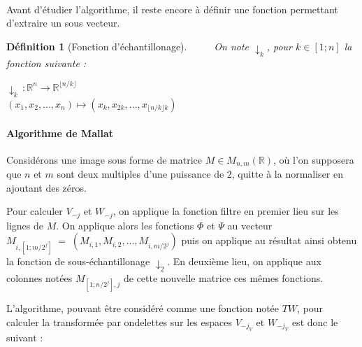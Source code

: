 \documentclass[a4paper,10pt]{report}
\theoremstyle{break}
\newtheorem{Def}{D\'{e}finition}
\begin{document}
    \paragraph{} Avant d'\'{e}tudier l'algorithme, il reste encore \`{a} d\'{e}finir une fonction permettant d'extraire un sous vecteur.
    
    \begin{Def}[Fonction d'\'{e}chantillonage]
	$\phantom{Prop}$ On note $\downarrow_k $, pour $k \in [1;n]$ la fonction suivante :
	\begin{center}
	  $ \downarrow_k \, : \mathbb{R}^n \longrightarrow \mathbb{R}^{\lfloor n / k \rfloor} $ \\
	  $ (x_1, x_2, ..., x_n) \longmapsto (x_k, x_{2 k}, ..., x_{\lfloor n / k \rfloor k}) $
	\end{center}
    \end{Def}
      
\newpage

    \paragraph{Algorithme de Mallat} Consid\'{e}rons une image sous forme de matrice $M \in M_{n,m}(\mathbb{R})$, o\`{u} l'on supposera
	que $n$ et $m$ sont deux multiples d'une puissance de $2$, quitte \`{a} la normaliser en ajoutant des z\'{e}ros. \newline
	
	Pour calculer $V_{-j}$ et $W_{-j}$, on applique la fonction filtre en premier lieu sur les lignes de $M$. \newline
	On applique alors les fonctions $ \varPhi $ et $\varPsi$ au vecteur 
	$ M_{i,[1;m/2^j]} \; = \; (M_{i,1}, M_{i,2}, ..., M_{i, m/2^j}) $ 
	puis on applique au r\'{e}sultat ainsi obtenu la fonction de sous-\'{e}chantillonage $\downarrow_2$.
	En deuxi\`{e}me lieu, on applique aux colonnes not\'{e}es $M_{[1;n/2^j], j}$ de cette nouvelle matrice ces m\^{e}mes fonctions.
	
	L'algorithme, pouvant \^{e}tre consid\'{e}r\'{e} comme une fonction not\'{e}e $TW$, 
	pour calculer la transform\'{e}e par ondelettes sur les espaces $V_{-j_V}$ et $W_{-j_V}$ est donc le suivant :
	
\end{document}
